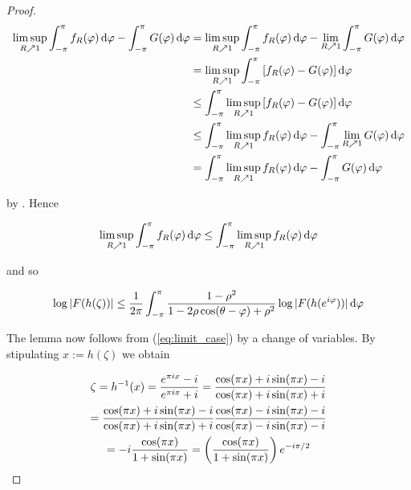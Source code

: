 \begin{proof}
\begin{equation*}
\begin{aligned}
	\limsup_{R \nearrow 1} \int_{-\pi}^\pi f_R(\varphi) \d\varphi - \int_{-\pi}^\pi G(\varphi)\d\varphi &= \limsup_{R \nearrow 1} \int_{-\pi}^\pi f_R(\varphi) \d\varphi - \lim_{R \nearrow 1}\int_{-\pi}^\pi G(\varphi)\d\varphi\\
	&= \limsup_{R \nearrow 1}\int_{-\pi}^\pi \sbr[0]{ f_R(\varphi) - G(\varphi)}\d\varphi\\
	&\leq \int_{-\pi}^\pi \limsup_{R \nearrow 1} \sbr[0]{f_R(\varphi) - G(\varphi)}\d\varphi\\
	&\leq \int_{-\pi}^\pi \limsup_{R \nearrow 1} f_R(\varphi) \d\varphi - \int_{-\pi}^\pi\lim_{R \nearrow 1} G(\varphi)\d\varphi\\
	&= \int_{-\pi}^\pi \limsup_{R \nearrow 1}f_R(\varphi) \d\varphi - \int_{-\pi}^\pi G(\varphi)\d\varphi
\end{aligned}
\end{equation*}

\noindent by \cite[358]{bourbaki:general_topology:1995}. Hence

\begin{equation*}
	\limsup_{R \nearrow 1} \int_{-\pi}^\pi f_R(\varphi) \mathop{}\!\mathrm{d}\varphi \leq\int_{-\pi}^\pi \limsup_{R \nearrow 1}f_R(\varphi) \mathop{}\!\mathrm{d}\varphi
\end{equation*}

\noindent and so 

\begin{equation}
	\log\abs[0]{ F( h( \zeta ) )} \leq \frac{1}{2\pi} \int_{-\pi}^\pi \frac{1 - \rho^2}{1 - 2\rho\cos( \theta - \varphi ) + \rho^2}\log\abs[0]{ F( h( e^{i\varphi}))}\d\varphi	
	\label{eq:limit_case}
\end{equation}

The lemma now follows from (\ref{eq:limit_case}) by a change of variables. By stipulating $x := h( \zeta )$ we obtain 

\begin{multline}
	\zeta = h^{-1}(x) = \frac{e^{\pi i x}- i}{e^{\pi i x} + i} = \frac{\cos(\pi x) + i\sin(\pi x) - i}{\cos(\pi x) + i\sin(\pi x) + i}\\
		= \frac{\cos(\pi x) + i\sin(\pi x) - i}{\cos(\pi x) + i\sin(\pi x) + i}\frac{\cos(\pi x) - i\sin(\pi x) - i}{\cos(\pi x) - i\sin(\pi x) - i}\\
		= -i \frac{\cos(\pi x)}{1 + \sin(\pi x)} = \del[3]{ \frac{\cos(\pi x)}{1 + \sin(\pi x)} }e^{-i\pi/2}
	\label{eq:radius_angle}
\end{multline}


\end{proof}
